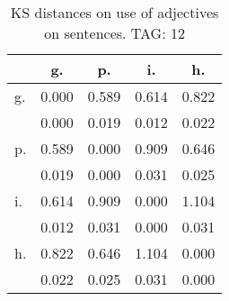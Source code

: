\begin{table}[h!]
\begin{center}
\begin{tabular}{| l | c | c | c | c |}\hline
 & g. & p. & i. & h. \\\hline
g. & 0.000  & 0.589  & 0.614  & 0.822 \\\hline
 & 0.000  & 0.019  & 0.012  & 0.022 \\\hline
p. & 0.589  & 0.000  & 0.909  & 0.646 \\\hline
 & 0.019  & 0.000  & 0.031  & 0.025 \\\hline
i. & 0.614  & 0.909  & 0.000  & 1.104 \\\hline
 & 0.012  & 0.031  & 0.000  & 0.031 \\\hline
h. & 0.822  & 0.646  & 1.104  & 0.000 \\\hline
 & 0.022  & 0.025  & 0.031  & 0.000 \\\hline
\end{tabular}
\caption{KS distances on use of adjectives on sentences. TAG: 12}
\end{center}
\end{table}